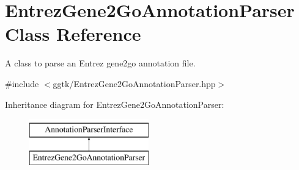 \hypertarget{classEntrezGene2GoAnnotationParser}{}\section{Entrez\+Gene2\+Go\+Annotation\+Parser Class Reference}
\label{classEntrezGene2GoAnnotationParser}


A class to parse an Entrez gene2go annotation file.  




{\ttfamily \#include $<$ggtk/\+Entrez\+Gene2\+Go\+Annotation\+Parser.\+hpp$>$}

Inheritance diagram for Entrez\+Gene2\+Go\+Annotation\+Parser\+:\begin{figure}[H]
\begin{center}
\leavevmode
\includegraphics[height=2.000000cm]{classEntrezGene2GoAnnotationParser}
\end{center}
\end{figure}
